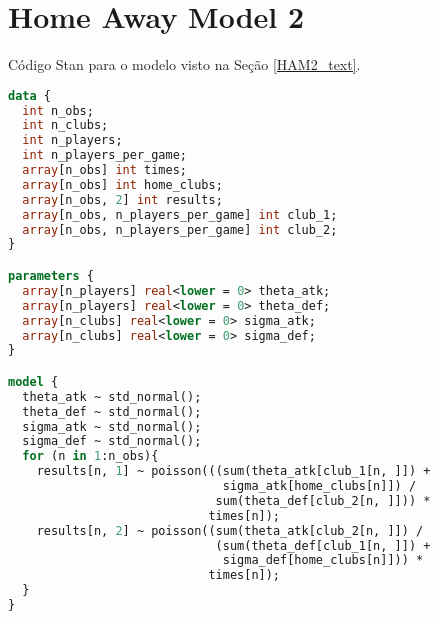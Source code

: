 \section{Home Away Model 2}
\label{stan_model_3}

Código Stan para o modelo visto na Seção \ref{HAM2_text}.

\begin{lstlisting}[language = Stan, firstnumber = 1]
data {
  int n_obs;
  int n_clubs;
  int n_players;
  int n_players_per_game;
  array[n_obs] int times;
  array[n_obs] int home_clubs;
  array[n_obs, 2] int results;
  array[n_obs, n_players_per_game] int club_1;
  array[n_obs, n_players_per_game] int club_2;
}

parameters {
  array[n_players] real<lower = 0> theta_atk;
  array[n_players] real<lower = 0> theta_def;
  array[n_clubs] real<lower = 0> sigma_atk;
  array[n_clubs] real<lower = 0> sigma_def;
}

model {
  theta_atk ~ std_normal();
  theta_def ~ std_normal();
  sigma_atk ~ std_normal();
  sigma_def ~ std_normal();
  for (n in 1:n_obs){
    results[n, 1] ~ poisson(((sum(theta_atk[club_1[n, ]]) +
                              sigma_atk[home_clubs[n]]) / 
                             sum(theta_def[club_2[n, ]])) *
                            times[n]);
    results[n, 2] ~ poisson((sum(theta_atk[club_2[n, ]]) / 
                             (sum(theta_def[club_1[n, ]]) +
                              sigma_def[home_clubs[n]])) *
                            times[n]);
  }
}
\end{lstlisting}
